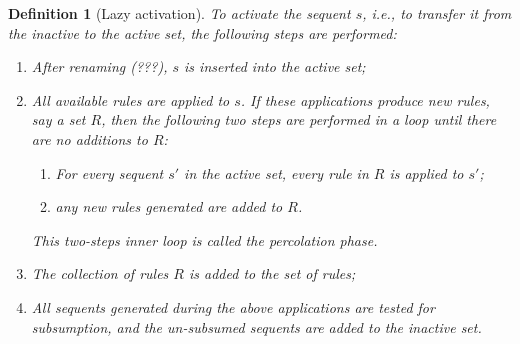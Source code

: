 \documentclass{article}
\newtheorem{definition}{Definition}
\begin{document}
\begin{definition}[Lazy activation]
  To activate the sequent $s$, i.e., to transfer it from the inactive to the
  active set, the following steps are performed:

  \begin{enumerate}
  \item After renaming (???), $s$ is inserted into the active set;
  \item All available rules are applied to $s$. If these applications produce
    new rules, say a set $R$, then the following two steps are performed in a
    loop until there are no additions to $R$:

    \begin{enumerate}
    \item For every sequent $s'$ in the active set, every rule in $R$ is applied
      to $s'$;
    \item any new rules generated are added to $R$.
    \end{enumerate}

    This two-steps inner loop is called the \emph{percolation} phase.
  \item The collection of rules $R$ is added to the set of rules;
  \item All sequents generated during the above applications are tested for
    subsumption, and the un-subsumed sequents are added to the inactive set.
  \end{enumerate}
\end{definition}
\end{document}
